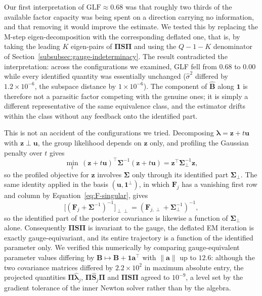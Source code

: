 Our first interpretation of $\mathrm{GLF}\approx0.68$ was that roughly two thirds of the available factor capacity was being spent on a direction carrying no information, and that removing it would improve the estimate. We tested this by replacing the M-step eigen-decomposition with the corresponding deflated one, that is, by taking the leading $K$ eigen-pairs of $\bm{\Pi}\mathbf{S}\bm{\Pi}$ and using the $Q-1-K$ denominator of Section~\ref{subsubsec:gauge-indeterminacy}. The result contradicted the interpretation: across the configurations we examined, GLF fell from $0.68$ to $0.00$ while every identified quantity was essentially unchanged ($\hat\sigma^2$ differed by $1.2\times10^{-6}$, the subspace distance by $1\times10^{-6}$). The component of $\hat{\mathbf{B}}$ along $\mathbf{1}$ is therefore not a parasitic factor competing with the genuine ones; it is simply a different representative of the same equivalence class, and the estimator drifts within the class without any feedback onto the identified part.
 
This is not an accident of the configurations we tried. Decomposing $\bm{\lambda}=\mathbf{z}+t\mathbf{u}$ with $\mathbf{z}\perp\mathbf{u}$, the group likelihood depends on $\mathbf{z}$ only, and profiling the Gaussian penalty over $t$ gives
\begin{equation}
\min_t\,(\mathbf{z}+t\mathbf{u})^\top\bm{\Sigma}^{-1}(\mathbf{z}+t\mathbf{u})=\mathbf{z}^\top\bm{\Sigma}_\perp^{-1}\mathbf{z},
\label{eq:profile-identity}
\end{equation}
so the profiled objective for $\mathbf{z}$ involves $\bm{\Sigma}$ only through its identified part $\bm{\Sigma}_\perp$. The same identity applied in the basis $(\mathbf{u},\mathbf{1}^\perp)$, in which $\mathbf{F}_j$ has a vanishing first row and column by Equation~\eqref{eq:F-singular}, gives
\begin{equation}
\Big[(\mathbf{F}_j+\bm{\Sigma}^{-1})^{-1}\Big]_{\perp\perp}=(\mathbf{F}_{j,\perp}+\bm{\Sigma}_\perp^{-1})^{-1},
\label{eq:posterior-identity}
\end{equation}
so the identified part of the posterior covariance is likewise a function of $\bm{\Sigma}_\perp$ alone. Consequently $\bm{\Pi}\mathbf{S}\bm{\Pi}$ is invariant to the gauge, the deflated EM iteration is exactly gauge-equivariant, and its entire trajectory is a function of the identified parameter only. We verified this numerically by comparing gauge-equivalent parameter values differing by $\mathbf{B}\mapsto\mathbf{B}+\mathbf{1}\mathbf{a}^\top$ with $\lVert\mathbf{a}\rVert$ up to $12.6$: although the two covariance matrices differed by $2.2\times10^2$ in maximum absolute entry, the projected quantities $\bm{\Pi}\hat{\bm{\lambda}}_j$, $\bm{\Pi}\hat{\mathbf{S}}_j\bm{\Pi}$ and $\bm{\Pi}\mathbf{S}\bm{\Pi}$ agreed to $10^{-9}$, a level set by the gradient tolerance of the inner Newton solver rather than by the algebra.

